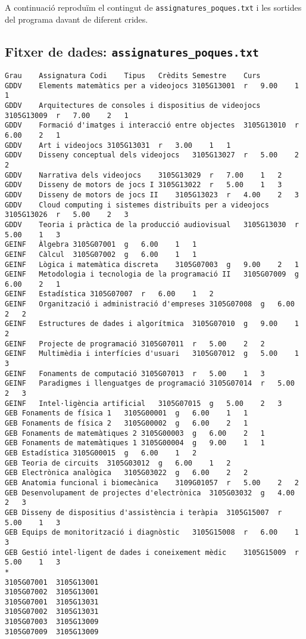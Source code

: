 \documentclass[10pt,a4paper]{../documents/class_material_assignatura_udg}
\begin{document}
A continuació reproduïm el contingut de \texttt{assignatures\_poques.txt} i les sortides del programa davant de diferent crides.



\subsection{Fitxer de dades: \texttt{assignatures\_poques.txt}}\label{sec:entrada}
\begin{verbatim}
Grau	Assignatura	Codi	Tipus	Crèdits	Semestre	Curs
GDDV	Elements matemàtics per a videojocs	3105G13001	r	9.00	1	1
GDDV	Arquitectures de consoles i dispositius de videojocs	3105G13009	r	7.00	2	1
GDDV	Formació d'imatges i interacció entre objectes	3105G13010	r	6.00	2	1
GDDV	Art i videojocs	3105G13031	r	3.00	1	1
GDDV	Disseny conceptual dels videojocs	3105G13027	r	5.00	2	2
GDDV	Narrativa dels videojocs	3105G13029	r	7.00	1	2
GDDV	Disseny de motors de jocs I	3105G13022	r	5.00	1	3
GDDV	Disseny de motors de jocs II	3105G13023	r	4.00	2	3
GDDV	Cloud computing i sistemes distribuïts per a videojocs	3105G13026	r	5.00	2	3
GDDV	Teoria i pràctica de la producció audiovisual	3105G13030	r	5.00	1	3
GEINF	Àlgebra	3105G07001	g	6.00	1	1
GEINF	Càlcul	3105G07002	g	6.00	1	1
GEINF	Lògica i matemàtica discreta	3105G07003	g	9.00	2	1
GEINF	Metodologia i tecnologia de la programació II	3105G07009	g	6.00	2	1
GEINF	Estadística	3105G07007	r	6.00	1	2
GEINF	Organització i administració d'empreses	3105G07008	g	6.00	2	2
GEINF	Estructures de dades i algorítmica	3105G07010	g	9.00	1	2
GEINF	Projecte de programació	3105G07011	r	5.00	2	2
GEINF	Multimèdia i interfícies d'usuari	3105G07012	g	5.00	1	3
GEINF	Fonaments de computació	3105G07013	r	5.00	1	3
GEINF	Paradigmes i llenguatges de programació	3105G07014	r	5.00	2	3
GEINF	Intel·ligència artificial	3105G07015	g	5.00	2	3
GEB	Fonaments de física 1	3105G00001	g	6.00	1	1
GEB	Fonaments de física 2	3105G00002	g	6.00	2	1
GEB	Fonaments de matemàtiques 2	3105G00003	g	6.00	2	1
GEB	Fonaments de matemàtiques 1	3105G00004	g	9.00	1	1
GEB	Estadística	3105G00015	g	6.00	1	2
GEB	Teoria de circuits	3105G03012	g	6.00	1	2
GEB	Electrònica analògica	3105G03022	g	6.00	2	2
GEB	Anatomia funcional i biomecànica	3109G01057	r	5.00	2	2
GEB	Desenvolupament de projectes d'electrònica	3105G03032	g	4.00	2	3
GEB	Disseny de dispositius d'assistència i teràpia	3105G15007	r	5.00	1	3
GEB	Equips de monitorització i diagnòstic	3105G15008	r	6.00	1	3
GEB	Gestió intel·ligent de dades i coneixement mèdic	3105G15009	r	5.00	1	3
*
3105G07001	3105G13001
3105G07002	3105G13001
3105G07001	3105G13031
3105G07002	3105G13031
3105G07003	3105G13009
3105G07009	3105G13009
\end{verbatim}
\end{document}
